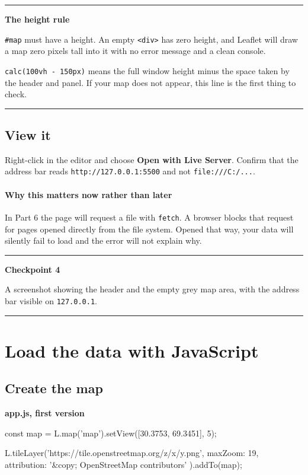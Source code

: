 \documentclass{article}
\newcommand{\cd}[1]{\texttt{#1}}
\newcommand{\cdb}[1]{\nolinkurl{#1}}
\newcommand{\codecap}[1]{%
  \par\vspace{.9em}\noindent\textbf{#1}\par\vspace{-.6em}}
\newenvironment{keypoint}[1]
  {\par\vspace{.7em}\noindent\rule{\linewidth}{.6pt}\par\vspace{.15em}
   \noindent\textbf{#1}\par\nobreak\vspace{-.3em}}
  {\par\vspace{.15em}\noindent\rule{\linewidth}{.6pt}\par\vspace{.7em}}
\begin{document}
\begin{keypoint}{The height rule}
\cd{\#map} must have a height. An empty \cd{<div>} has zero height, and
Leaflet will draw a map zero pixels tall into it with no error message
and a clean console.

\cd{calc(100vh - 150px)} means the full window height minus the space
taken by the header and panel. If your map does not appear, this line is
the first thing to check.
\end{keypoint}


\subsection{View it}

Right-click in the editor and choose \textbf{Open with Live Server}.
Confirm that the address bar reads \cdb{http://127.0.0.1:5500} and not
\cdb{file:///C:/...}.

\paragraph{Why this matters now rather than later}
In Part 6 the page will request a file with \cd{fetch}. A browser blocks
that request for pages opened directly from the file system. Opened that
way, your data will silently fail to load and the error will not explain
why.


\begin{keypoint}{Checkpoint 4}
A screenshot showing the header and the empty grey map area, with the
address bar visible on \cd{127.0.0.1}.
\end{keypoint}


\section{Load the data with JavaScript}

\subsection{Create the map}

\codecap{app.js, first version}
\begin{code}
const map = L.map('map').setView([30.3753, 69.3451], 5);

L.tileLayer('https://tile.openstreetmap.org/{z}/{x}/{y}.png', {
  maxZoom: 19,
  attribution: '&copy; OpenStreetMap contributors'
}).addTo(map);
\end{code}
\end{document}
